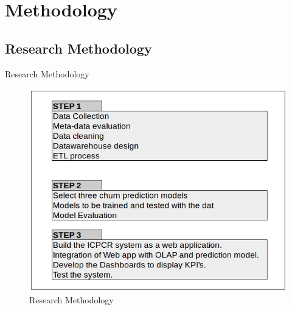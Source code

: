 \documentclass{beamer}
\begin{document}
\section{Methodology}

\subsection{Research Methodology}
\begin{frame}{Research Methodology}
	\begin{figure}
		\includegraphics[scale = 0.35]{ppt_figures/ICPCR.png}
		\centering
		\caption{Research Methodology}
	\end{figure}
\end{frame}
\end{document}
